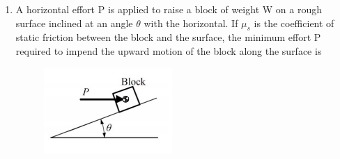 \documentclass[a4paper,10pt]{article}
\begin{document}
\begin{enumerate}
    \item A horizontal effort P is applied to raise a block of weight W on a rough surface inclined at an angle $\theta$ with the horizontal. If $\mu_s$ is the coefficient of static friction between the block and the surface, the minimum effort P required to impend the upward motion of the block along the surface is
    \begin{figure}[H] \centering \includegraphics[width=0.4\columnwidth]{q11_solid.png} \caption*{} \label{fig:q11_solid} \end{figure}
    \hfill{}
    \begin{enumerate}[label=\Alph*)]
    \end{enumerate}


\end{enumerate}
\end{document}
